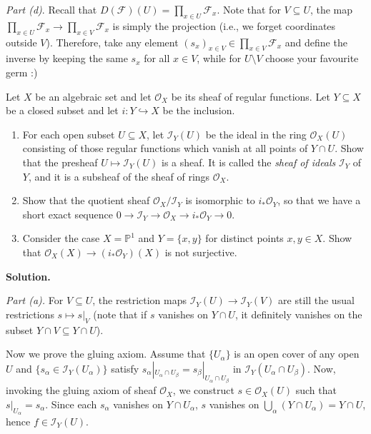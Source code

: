 \documentclass{template}
\begin{document}
\textcolor{blue!70!black}{\textit{Part (d)}}. Recall that $D(\mathcal{F})(U) =
\prod_{x \in U}\mathcal{F}_x$. Note that for $V \subseteq U$, the map $\prod_{x
\in U}\mathcal{F}_x \to \prod_{x \in V}\mathcal{F}_x$ is simply the projection
(i.e., we forget coordinates outside $V$). Therefore, take any element $(s_x)_{x
\in V} \in \prod_{x \in V}\mathcal{F}_x$ and define the inverse by keeping the
same $s_x$ for all $x \in V$, while for $U \setminus V$ choose your favourite
germ :)

\begin{problem}[Exercise 5]
    Let $X$ be an algebraic set and let $\mathcal{O}_X$ be its sheaf of regular
    functions. Let $Y \subseteq X$ be a closed subset and let $i: Y
    \hookrightarrow X$ be the inclusion.
    \begin{enumerate}
        \item[(a)] For each open subset $U \subseteq X$, let $\mathcal{I}_Y(U)$
        be the ideal in the ring $\mathcal{O}_X(U)$ consisting of those regular 
        functions which vanish at all points of $Y \cap U$. Show that the presheaf 
        $U \mapsto \mathcal{I}_Y(U)$ is a sheaf. It is called the \textit{sheaf 
        of ideals} $\mathcal{I}_Y$ of $Y$, and it is a subsheaf of the sheaf of rings 
        $\mathcal{O}_X$.
        \item[(b)] Show that the quotient sheaf $\mathcal{O}_X/\mathcal{I}_Y$ is 
        isomorphic to $i_*\mathcal{O}_Y$, so that we have a short exact sequence
        $0 \to \mathcal{I}_Y \to \mathcal{O}_X \to i_*\mathcal{O}_Y \to 0$.
        \item[(c)] Consider the case $X=\mathbb{P}^1$ and $Y=\{x,y\}$ for distinct 
        points $x,y \in X$. Show that $\mathcal{O}_X(X) \to (i_*\mathcal{O}_Y)(X)$
        is not surjective.
    \end{enumerate}
\end{problem}

\textbf{Solution.}

\textcolor{blue!70!black}{\textit{Part (a).}} For $V \subseteq U$, the
restriction maps $\mathcal{I}_Y(U) \to \mathcal{I}_Y(V)$ are still the usual
restrictions $s \mapsto s|_V$ (note that if $s$ vanishes on $Y \cap U$, it
definitely vanishes on the subset $Y \cap V \subseteq Y \cap U$).

Now we prove the gluing axiom. Assume that $\{U_{\alpha}\}$ is an open cover of
any open $U$ and $\{s_{\alpha} \in \mathcal{I}_Y(U_{\alpha})\}$ satisfy
$s_{\alpha}|_{U_{\alpha} \cap U_{\beta}} = s_{\beta}|_{U_{\alpha} \cap
U_{\beta}}$ in $\mathcal{I}_Y(U_{\alpha} \cap U_{\beta})$. Now, invoking the
gluing axiom of sheaf $\mathcal{O}_X$, we construct $s \in \mathcal{O}_X(U)$
such that $s|_{U_{\alpha}} = s_{\alpha}$. Since each $s_{\alpha}$ vanishes on $Y
\cap U_{\alpha}$, $s$ vanishes on $\bigcup_{\alpha} (Y \cap U_{\alpha}) = Y \cap U$, 
hence $f \in \mathcal{I}_Y(U)$.
\end{document}

